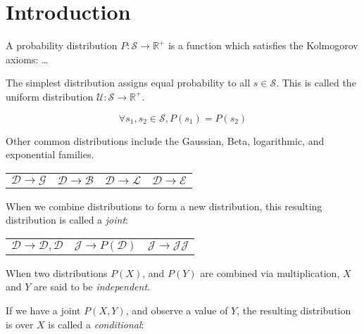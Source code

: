 \documentclass{article}
\begin{document}
\section{Introduction}\label{sec:intro}

A probability distribution $P: \mathcal S \rightarrow \mathbb R^+$ is a function which satisfies the Kolmogorov axioms: \ldots


The simplest distribution assigns equal probability to all $s \in \mathcal S$. This is called the uniform distribution $\mathcal{U}: \mathcal{S} \rightarrow \mathbb{R}^+$.

$$
\forall s_1, s_2 \in \mathcal S, P(s_1) = P(s_2)
$$

Other common distributions include the Gaussian, Beta, logarithmic, and exponential families.

\begin{center}
    \begin{tabular}{cccc}
        $\mathcal{D} \rightarrow \mathcal{G}$ &
        $\mathcal{D} \rightarrow \mathcal{B}$ &
        $\mathcal{D} \rightarrow \mathcal{L}$ &
        $\mathcal{D} \rightarrow \mathcal{E}$ &
    \end{tabular}
\end{center}

When we combine distributions to form a new distribution, this resulting distribution is called a \textit{joint}:

\begin{center}
\begin{tabular}{ccc}
    $\mathcal{D} \rightarrow \mathcal{D}, \mathcal{D}$ &$\mathcal{J} \rightarrow P(\mathcal{D})$ &$\mathcal{J} \rightarrow \mathcal{J}\mathcal{J}$\\
\end{tabular}
\end{center}

When two distributions $P(X)$, and $P(Y)$ are combined via multiplication, $X$ and $Y$ are said to be \textit{independent}.

\begin{prooftree}
\end{prooftree}

If we have a joint $P(X, Y)$, and observe a value of $Y$, the resulting distribution is over $X$ is called a \textit{conditional}:
\end{document}
